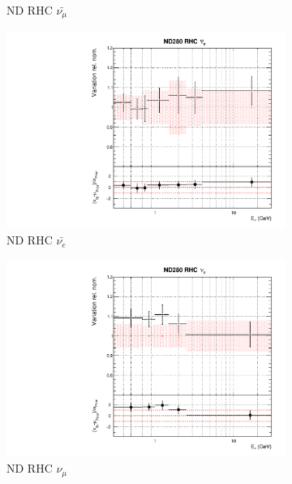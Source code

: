 \begin{figure}
\begin{subfigure}{0.24\textwidth}
  \caption{ND RHC $\bar{\nu_{\mu}}$}
  \label{fig:}
\end{subfigure}
\begin{subfigure}{0.24\textwidth}
  \centering
  \includegraphics[width=0.95\linewidth]{figs/datflux5}
  \caption{ND RHC $\bar{\nu_{e}}$}
  \label{fig:}
\end{subfigure}
\begin{subfigure}{0.24\textwidth}
  \centering
  \includegraphics[width=0.95\linewidth]{figs/datflux6}
  \caption{ND RHC $\nu_{\mu}$}
  \label{fig:}
\end{subfigure}
\vspace{15mm}
\begin{subfigure}{0.24\textwidth}
  \centering

\end{subfigure}
\end{figure}
